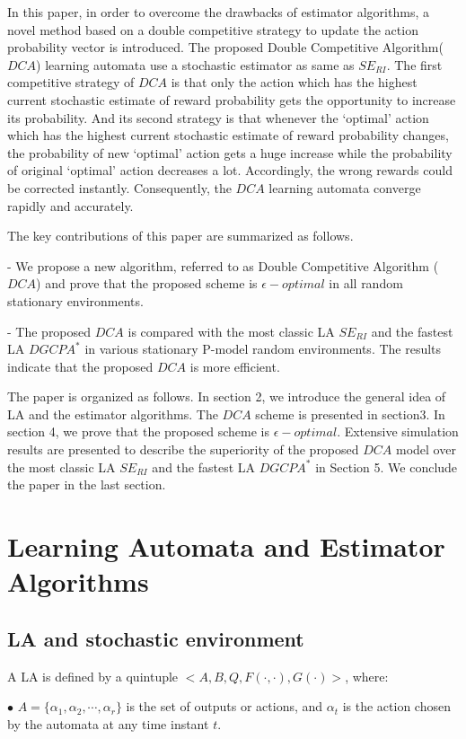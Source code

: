 In this paper, in order to overcome the drawbacks of estimator algorithms, a novel method based on a double competitive strategy to update the action probability vector is introduced. The proposed Double Competitive Algorithm($DCA$) learning automata use a stochastic estimator as same as $SE_{RI}$. The first competitive strategy of $DCA$ is that only the action which has the highest current stochastic estimate of reward probability gets the opportunity to increase its probability. And its second strategy is that whenever the ‘optimal’ action which has the highest current stochastic estimate of reward probability changes, the probability of new ‘optimal’ action gets a huge increase while the probability of original ‘optimal’ action decreases a lot. Accordingly, the wrong rewards could be corrected instantly. Consequently, the $DCA$ learning automata converge rapidly and accurately.

The key contributions of this paper are summarized as follows.

-	We propose a new algorithm, referred to as Double Competitive Algorithm ($DCA$) and prove that the proposed scheme is $\epsilon-optimal$ in all random stationary environments.

-	The proposed $DCA$ is compared with the most classic LA $SE_{RI}$ and the fastest LA $DGCPA^{*}$ in various stationary P-model random environments. The results indicate that the proposed $DCA$ is more efficient.

The paper is organized as follows. In section 2, we introduce the general idea of LA and the estimator algorithms. The $DCA$ scheme is presented in section3. In section 4, we prove that the proposed scheme is $\epsilon-optimal$. Extensive simulation results are presented to describe the superiority of the proposed $DCA$ model over the most classic LA $SE_{RI}$ and the fastest LA $DGCPA^{*}$ in Section 5. We conclude the paper in the last section.

\section{Learning Automata and Estimator Algorithms}
\label{sec:1}
\subsection{LA and stochastic environment}
A LA is defined by a quintuple $ < A,B,Q,F( \cdot , \cdot ),G( \cdot ) > $, where:

$\bullet$ $A = \{ {\alpha _1},{\alpha _2}, \cdots ,{\alpha _r}\} $ is the set of outputs or actions, and ${\alpha _t}$ is the action chosen by the automata at any time instant $t$.

